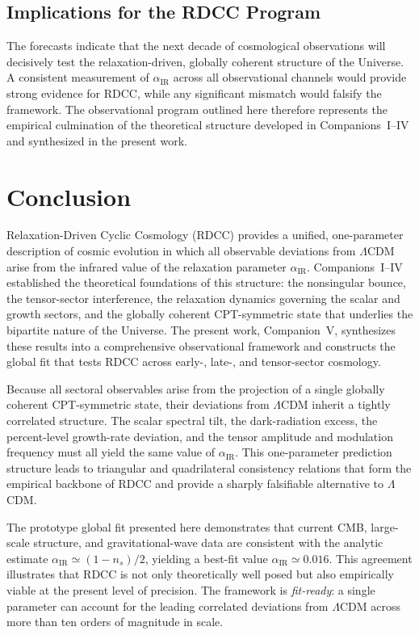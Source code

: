 \documentclass[11pt,a4paper]{article}
\begin{document}
\subsection{Implications for the RDCC Program}

The forecasts indicate that the next decade of cosmological observations will decisively test the
relaxation-driven, globally coherent structure of the Universe. A consistent measurement of
$\alpha_{\mathrm{IR}}$ across all observational channels would provide strong evidence for RDCC,
while any significant mismatch would falsify the framework. The observational program outlined
here therefore represents the empirical culmination of the theoretical structure developed in
Companions~I–IV and synthesized in the present work.

\section{Conclusion}

Relaxation-Driven Cyclic Cosmology (RDCC) provides a unified, one-parameter description of
cosmic evolution in which all observable deviations from $\Lambda$CDM arise from the infrared
value of the relaxation parameter $\alpha_{\mathrm{IR}}$. Companions~I–IV established the theoretical
foundations of this structure: the nonsingular bounce, the tensor-sector interference, the
relaxation dynamics governing the scalar and growth sectors, and the globally coherent
CPT-symmetric state that underlies the bipartite nature of the Universe. The present work,
Companion~V, synthesizes these results into a comprehensive observational framework and
constructs the global fit that tests RDCC across early-, late-, and tensor-sector cosmology.

Because all sectoral observables arise from the projection of a single globally coherent
CPT-symmetric state, their deviations from $\Lambda$CDM inherit a tightly correlated structure.
The scalar spectral tilt, the dark-radiation excess, the percent-level growth-rate deviation, and
the tensor amplitude and modulation frequency must all yield the same value of
$\alpha_{\mathrm{IR}}$. This one-parameter prediction structure leads to triangular and quadrilateral
consistency relations that form the empirical backbone of RDCC and provide a sharply
falsifiable alternative to $\Lambda$CDM.

The prototype global fit presented here demonstrates that current CMB, large-scale structure,
and gravitational-wave data are consistent with the analytic estimate
$\alpha_{\mathrm{IR}} \simeq (1 - n_s)/2$, yielding a best-fit value
$\alpha_{\mathrm{IR}} \simeq 0.016$. This agreement illustrates that RDCC is not only theoretically
well posed but also empirically viable at the present level of precision. The framework is
\emph{fit-ready}: a single parameter can account for the leading correlated deviations from
$\Lambda$CDM across more than ten orders of magnitude in scale.
\end{document}
